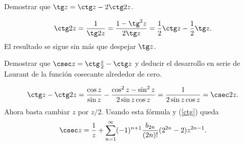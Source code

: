 \begin{exercise} \label{ej.tangente} Demostrar que $\tg z=\ctg z-2\ctg 2z$.
\end{exercise}

\begin{solution}
$$\ctg 2z=\frac{1}{\tg 2z}=\frac{1-\tg^2 z}{2\tg z}=
\frac{1}{2}\ctg z-\frac{1}{2}\tg z.$$
El resultado se sigue sin m\'as que despejar $\tg z$.
\end{solution}

\begin{exercise}\label{EjercicioCosecante} Demostrar que $\csec z=\ctg \frac{z}{2}-\ctg z$ y deducir el desarrollo en serie de Laurant de la funci\'on cosecante alrededor de cero.
\end{exercise}

\begin{solution}
$$\ctg z-\ctg 2z=\frac{\cos z}{\sin z}-\frac{\cos^2z-\sin^2z}{2\sin z\cos z}=\frac{1}{2\sin z\cos z}=\csec 2z.$$
Ahora basta cambiar $z$ por $z/2$. Usando esta f\'ormula y (\ref{ctg}) queda
$$\csec z=\frac{1}{z}+\sum_{n=1}^\infty (-1)^{n+1}\frac{b_{2n}}{(2n)!}(2^{2n}-2)z^{2n-1}.$$
\end{solution} 